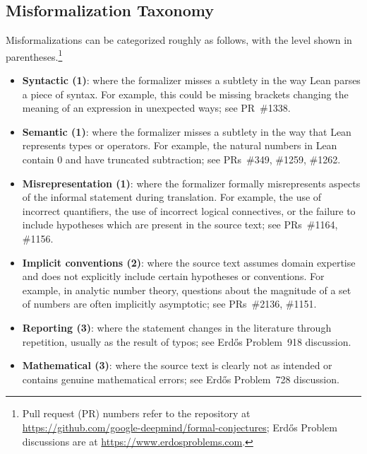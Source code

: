 \subsection{Misformalization Taxonomy}\label{sec:app_misform_taxonomy}

Misformalizations can be categorized roughly as follows, with the level shown in parentheses.\footnote{Pull request (PR) numbers refer to the repository at \url{https://github.com/google-deepmind/formal-conjectures}; Erd\H{o}s Problem discussions are at \url{https://www.erdosproblems.com}.}
\begin{itemize}
    \item \textbf{Syntactic (1)}: where the formalizer misses a subtlety in the way Lean parses a piece of syntax. For example, this could be missing brackets changing the meaning of an expression in unexpected ways; see PR~\#1338.
    \item \textbf{Semantic (1)}: where the formalizer misses a subtlety in the way that Lean represents types or operators. For example, the natural numbers in Lean contain $0$ and have truncated subtraction; see PRs~\#349, \#1259, \#1262.
    \item \textbf{Misrepresentation (1)}: where the formalizer formally misrepresents aspects of the informal statement during translation. For example, the use of incorrect quantifiers, the use of incorrect logical connectives, or the failure to include hypotheses which are present in the source text; see PRs~\#1164, \#1156.
    \item \textbf{Implicit conventions (2)}: where the source text assumes domain expertise and does not explicitly include certain hypotheses or conventions. For example, in analytic number theory, questions about the magnitude of a set of numbers are often implicitly asymptotic; see PRs~\#2136, \#1151.
    \item \textbf{Reporting (3)}: where the statement changes in the literature through repetition, usually as the result of typos; see Erd\H{o}s Problem~918 discussion.
    \item \textbf{Mathematical (3)}: where the source text is clearly not as intended or contains genuine mathematical errors; see Erd\H{o}s Problem~728 discussion.
\end{itemize}

